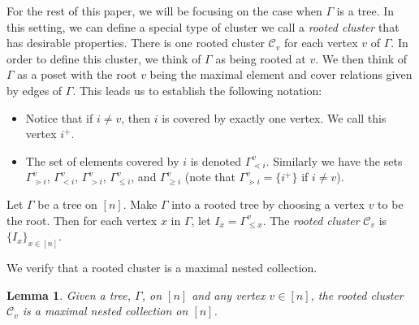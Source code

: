 \documentclass[pdftex]{sigma}
\numberwithin{equation}{section}
\newtheorem{Lemma}[Theorem]{Lemma}
\newcommand{\calC}{\mathcal{C}}
\begin{document}
For the rest of this paper, we will be focusing on the case when $\Gamma$ is a tree. In this setting, we can define a special type of cluster we call a \emph{rooted cluster} that has desirable properties. There is one rooted cluster $\calC_v$ for each vertex $v$ of $\Gamma$. In order to define this cluster, we think of $\Gamma$ as being rooted at $v$. We then think of $\Gamma$ as a poset with the root $v$ being the maximal element and cover relations given by edges of $\Gamma$. This leads us to establish the following notation:
\begin{itemize}\itemsep=0pt
 \item Notice that if $i\neq v$, then $i$ is covered by exactly one vertex. We call this vertex $i^+$.
 \item The set of elements covered by $i$ is denoted $\Gamma_{\lessdot i}^v$. Similarly we have the sets $\Gamma_{\gtrdot i}^v$, $\Gamma_{< i}^v$, $\Gamma_{> i}^v$, $\Gamma_{\leq i}^v$, and $\Gamma_{\geq i}^v$ (note that $\Gamma_{\gtrdot i}^v=\{i^+\}$ if $i\neq v$).
\end{itemize}

\begin{Definition}\label{defn:rooted-cluster}
Let $\Gamma$ be a tree on $[n]$. Make $\Gamma$ into a rooted tree by choosing a vertex $v$ to be the root. Then for each vertex $x$ in $\Gamma$, let $I_x=\Gamma_{\leq x}^v$. The \emph{rooted cluster} $\calC_v$ is $\{I_x\}_{x\in[n]}$.
\end{Definition}


We verify that a rooted cluster is a maximal nested collection.

\begin{Lemma}
Given a tree, $\Gamma$, on $[n]$ and any vertex $v \in [n]$, the rooted cluster $\calC_v$ is a maximal nested collection on $[n]$.
\end{Lemma}
\end{document}
